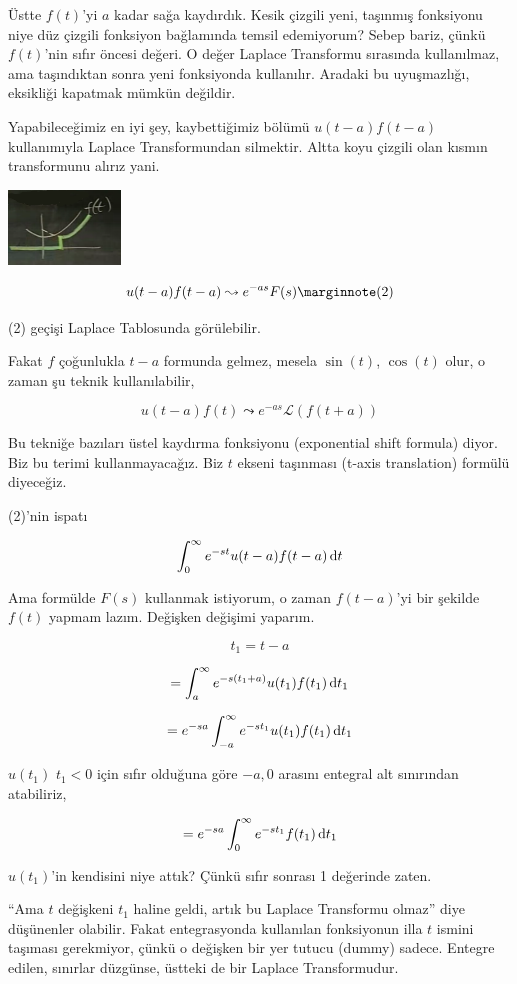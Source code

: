 \documentclass[12pt,fleqn]{article}\usepackage{../../common}
\begin{document}
Üstte $f(t)$'yi $a$ kadar sağa kaydırdık. Kesik çizgili yeni, taşınmış
fonksiyonu niye düz çizgili fonksiyon bağlamında temsil edemiyorum? Sebep
bariz, çünkü $f(t)$'nin sıfır öncesi değeri. O değer Laplace Transformu
sırasında kullanılmaz, ama taşındıktan sonra yeni fonksiyonda
kullanılır. Aradaki bu uyuşmazlığı, eksikliği kapatmak mümkün değildir. 

Yapabileceğimiz en iyi şey, kaybettiğimiz bölümü $u(t-a)f(t-a)$ kullanımıyla
Laplace Transformundan silmektir. Altta koyu çizgili olan kısmın
transformunu alırız yani.

\includegraphics[height=2cm]{22_8.png}

$$ u(t-a)f(t-a) \leadsto e^{-as}F(s) 
\mlabel{2}
$$

(2) geçişi Laplace Tablosunda görülebilir.

Fakat $f$ çoğunlukla $t-a$ formunda gelmez, mesela $\sin(t)$, $\cos(t)$
olur, o zaman şu teknik kullanılabilir,

$$ u(t-a)f(t) \leadsto e^{-as}\mathcal{L}(f(t+a)) $$

Bu tekniğe bazıları üstel kaydırma fonksiyonu (exponential shift formula)
diyor. Biz bu terimi kullanmayacağız. Biz $t$ ekseni taşınması (t-axis
translation) formülü diyeceğiz. 

(2)'nin ispatı

$$ \int_{0}^{\infty}e^{-st}u(t-a)f(t-a) \,\mathrm{d} t $$

Ama formülde $F(s)$ kullanmak istiyorum, o zaman $f(t-a)$'yi bir şekilde
$f(t)$ yapmam lazım. Değişken değişimi yaparım. 

$$ t_1 = t-a $$

$$ = \int_{a}^{\infty}e^{-s(t_1+a)}u(t_1)f(t_1) \,\mathrm{d} t_1 $$

$$ = e^{-sa} \int_{-a}^{\infty}e^{-st_1}u(t_1)f(t_1) \,\mathrm{d} t_1 $$

$u(t_1)$ $t_1<0$ için sıfır olduğuna göre $-a,0$ arasını entegral alt
sınırından atabiliriz, 

$$ = e^{-sa} \int_{0}^{\infty}e^{-st_1}f(t_1) \,\mathrm{d} t_1 $$

$u(t_1)$'in kendisini niye attık? Çünkü sıfır sonrası 1 değerinde zaten. 

``Ama $t$ değişkeni $t_1$ haline geldi, artık bu Laplace Transformu olmaz''
diye düşünenler olabilir. Fakat entegrasyonda kullanılan fonksiyonun illa
$t$ ismini taşıması gerekmiyor, çünkü o değişken bir yer tutucu (dummy)
sadece. Entegre edilen, sınırlar düzgünse, üstteki de bir Laplace
Transformudur.
\end{document}
